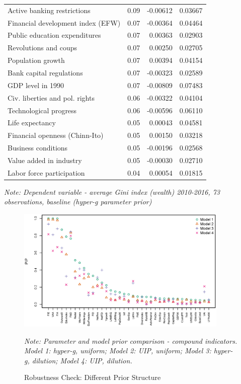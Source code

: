 \begin{refsection}
\begin{table}[!ht]
\begin{threeparttable}
\begin{tabular}{lrrr}
  Active banking restrictions & 0.09 & -0.00612 & 0.03667 \\ 
  Financial development index (EFW) & 0.07 & -0.00364 & 0.04464 \\ 
  Public education expenditures & 0.07 & 0.00363 & 0.02903 \\ 
  Revolutions and coups & 0.07 & 0.00250 & 0.02705 \\ 
  Population growth & 0.07 & 0.00394 & 0.04154 \\ 
  Bank capital regulations & 0.07 & -0.00323 & 0.02589 \\ 
  GDP level in 1990 & 0.07 & -0.00809 & 0.07483 \\ 
  Civ. liberties and pol. rights & 0.06 & -0.00322 & 0.04104 \\ 
  Technological progress & 0.06 & -0.00596 & 0.06110 \\ 
  Life expectancy & 0.05 & 0.00043 & 0.04581 \\ 
  Financial openness (Chinn-Ito) & 0.05 & 0.00150 & 0.03218 \\ 
  Business conditions & 0.05 & -0.00196 & 0.02568 \\ 
  Value added in industry & 0.05 & -0.00030 & 0.02710 \\ 
  Labor force participation & 0.04 & 0.00054 & 0.01815 \\ 
  \midrule
  \bottomrule
\end{tabular}
\begin{tablenotes}
\item 
\footnotesize
\textit{Note: Dependent variable - average Gini index (wealth) 2010-2016, 73 observations, baseline (hyper-g parameter prior)}
\end{tablenotes}
\end{threeparttable}
\end{table}

\clearpage
\begin{figure}
	\caption{Robustness Check: Different Prior Structure}
	\centering
	\includegraphics[width=0.9\textwidth]{figures/ch3/priors_comparison_compound.eps}
  \label{ch3fig:comp_compound}
  \begin{minipage}{0.8\textwidth}
    \footnotesize
    \emph{Note: Parameter and model prior comparison - compound indicators. Model 1: hyper-g, uniform; Model 2: \ac{UIP}, uniform; Model 3: hyper-g, dilution; Model 4: \ac{UIP}, dilution.}
  \end{minipage}
\end{figure}


\end{refsection}
